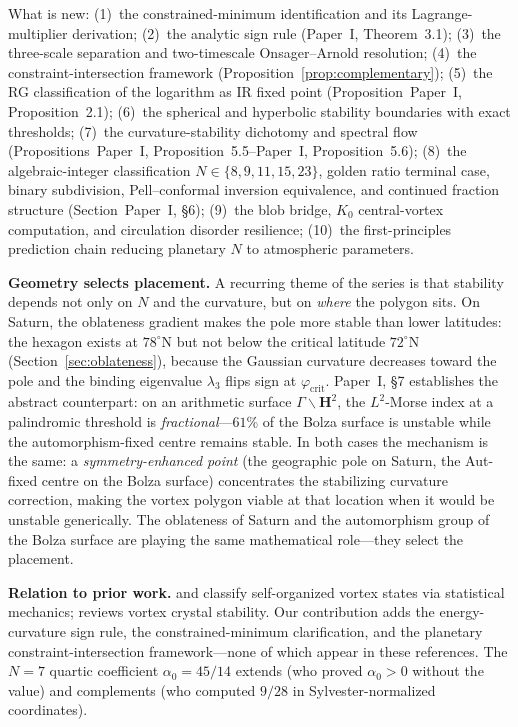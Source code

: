 \smallskip\noindent
What is new:
(1)~the constrained-minimum identification and its
Lagrange-multiplier derivation;
(2)~the analytic sign rule (Paper~I, Theorem~3.1);
(3)~the three-scale separation and two-timescale Onsager--Arnold
resolution;
(4)~the constraint-intersection framework
(Proposition~\ref{prop:complementary});
(5)~the RG classification of the logarithm as IR fixed point
(Proposition~Paper~I, Proposition~2.1);
(6)~the spherical and hyperbolic stability boundaries
with exact thresholds;
(7)~the curvature-stability dichotomy and spectral flow
(Propositions~Paper~I, Proposition~5.5--Paper~I, Proposition~5.6);
(8)~the algebraic-integer classification $N \in \{8,9,11,15,23\}$,
golden ratio terminal case, binary subdivision, Pell--conformal
inversion equivalence, and continued fraction structure
(Section~Paper~I, \S6);
(9)~the blob bridge, $K_0$ central-vortex computation, and
circulation disorder resilience;
(10)~the first-principles prediction chain reducing planetary
$N$ to atmospheric parameters.

\smallskip\noindent\textbf{Geometry selects placement.}
A recurring theme of the series is that stability depends not
only on $N$ and the curvature, but on \emph{where} the polygon
sits.  On Saturn, the oblateness gradient makes the pole more
stable than lower latitudes: the hexagon exists at
$78^\circ$N but not below the critical latitude
$72^\circ$N (Section~\ref{sec:oblateness}), because the
Gaussian curvature decreases toward the pole and the binding
eigenvalue $\lambda_3$ flips sign at $\varphi_{\mathrm{crit}}$.
Paper~I, \S7 establishes the abstract counterpart:
on an arithmetic surface
$\Gamma\backslash\mathbf{H}^2$, the $L^2$-Morse index at
a palindromic threshold is \emph{fractional}---$61\%$ of the
Bolza surface is unstable while the automorphism-fixed centre
remains stable.
In both cases the mechanism is the same: a
\emph{symmetry-enhanced point} (the geographic pole on Saturn,
the Aut-fixed centre on the Bolza surface) concentrates the
stabilizing curvature correction, making the vortex polygon
viable at that location when it would be unstable generically.
The oblateness of Saturn and the automorphism group of the
Bolza surface are playing the same mathematical role---they
select the placement.

\smallskip\noindent\textbf{Relation to prior work.}
\citet{BouchetVenaille2012} and \citet{ChavanisSommeria1996} classify
self-organized vortex states via statistical mechanics;
\citet{Aref2003} reviews vortex crystal stability.
Our contribution adds the energy-curvature sign rule, the
constrained-minimum clarification, and the planetary
constraint-intersection framework---none of which appear in
these references.  The $N = 7$ quartic coefficient $\alpha_0 = 45/14$
extends \citet{KurakinYudovich2002} (who proved $\alpha_0 > 0$
without the value) and complements \citet{Schmidt2004} (who computed
$9/28$ in Sylvester-normalized coordinates).


